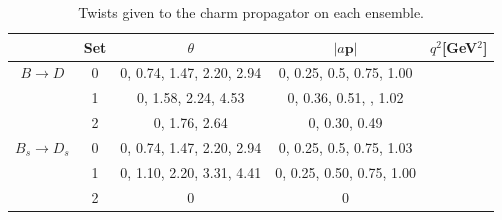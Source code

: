 \begin{table}[htb!]
\begin{center}
 \begin{tabular}{c c c c c}
 \hline
 & Set & $\theta$ & $|a{\textbf{p}}|$ & $q^2$[GeV$^2$] \\ [0.5ex] 
 \hline
 $B\to D$ & 0 & 0, 0.74, 1.47, 2.20, 2.94 & 0, 0.25, 0.5, 0.75, 1.00 & \\ [1ex]
 & 1 & 0, 1.58, 2.24, 4.53 & 0, 0.36, 0.51, , 1.02 & \\ [1ex]
 & 2 & 0, 1.76, 2.64 & 0, 0.30, 0.49 \\ [1ex]
 \hline
 $B_s\to D_s$ & 0 & 0, 0.74, 1.47, 2.20, 2.94 & 0, 0.25, 0.5, 0.75, 1.03 & \\ [1ex]
 & 1 & 0, 1.10, 2.20, 3.31, 4.41 & 0, 0.25, 0.50, 0.75, 1.00 & \\ [1ex]
 & 2 & 0 & 0 & \\ [1ex]
 \hline
\end{tabular}
 \caption{Twists given to the charm propagator on each ensemble. \label{tab:nrqcd_twists} }
 \end{center}
\end{table}

{}


